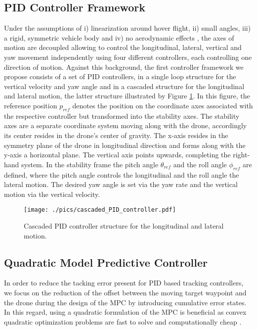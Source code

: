 \subsection{PID Controller Framework} \label{sec:pid_controller_framework}
Under the assumptions of i) linearization around hover flight, ii) small angles, iii) a rigid, symmetric vehicle body and iv) no aerodynamic effects \cite{wang2016}, the axes of motion are decoupled  allowing to control the longitudinal, lateral, vertical and yaw movement independently using four different controllers, each controlling one direction of motion. Against this background, the first controller framework we propose consists of a set of PID controllers, in a single loop structure for the vertical velocity and yaw angle and in a cascaded structure for the longitudinal and lateral motion, the latter structure illustrated by Figure \ref{fig:cascaded_PI_controller}. In this figure, the reference position $p_{ref}$  denotes the position on the  coordinate axes associated with  the respective controller but transformed into the stability axes. The stability axes are a separate coordinate system moving along with the drone, accordingly its center resides in the drone's center of gravity. The x-axis resides in the symmetry plane of the drone in longitudinal direction and forms along with the y-axis a horizontal plane. The vertical axis points upwards, completing the right-hand system. In the stability frame the pitch angle $\theta_{ref}$ and the roll angle $\phi_{ref}$ are defined, where the pitch angle controls the longitudinal and the roll angle the lateral motion. The desired yaw angle is set via the yaw rate and the vertical motion via the vertical velocity.

\begin{figure}[thpb]
      \centering
		\texttt{[image: ./pics/cascaded\_PID\_controller.pdf]}
\caption{Cascaded PID controller structure for the longitudinal and lateral motion. }
\label{fig:cascaded_PI_controller}
 \end{figure}

\subsection{Quadratic Model Predictive Controller}\label{sec:mpc}
In order to reduce the tacking error present for PID based tracking controllers, we focus on the reduction of the offset between the moving target waypoint and the drone during the design of the MPC by introducing cumulative error states. In this regard, using a quadratic formulation of the MPC is beneficial as convex quadratic optimization problems are fast to solve and computationally cheap \cite{boyd2004}.

